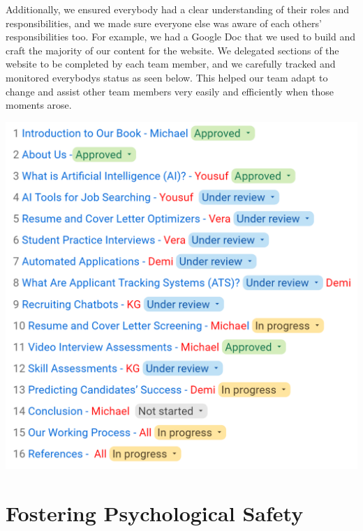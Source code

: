 \documentclass[
]{book}
\begin{document}
Additionally, we ensured everybody had a clear understanding of their roles and responsibilities, and we made sure everyone else was aware of each others' responsibilities too. For example, we had a Google Doc that we used to build and craft the majority of our content for the website. We delegated sections of the website to be completed by each team member, and we carefully tracked and monitored everybody\textquotesingle s status as seen below. This helped our team adapt to change and assist other team members very easily and efficiently when those moments arose.

\includegraphics[width=5.52083in,height=\textheight]{work delegation.png}

\hypertarget{fostering-psychological-safety}{%
\section{Fostering Psychological Safety}\label{fostering-psychological-safety}}
\end{document}
